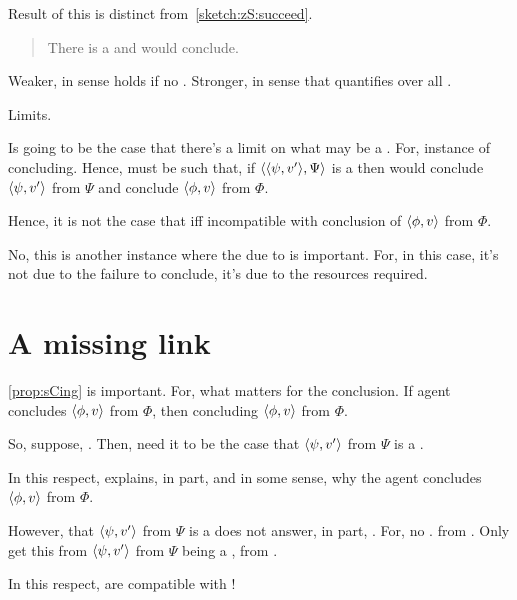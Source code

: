 \begin{note}
  Result of this is distinct from~\autoref{sketch:zS:succeed}.

  \begin{quote}
    There is a \curb{} and would conclude.
  \end{quote}

  Weaker, in sense holds if no \curb{}.
  Stronger, in sense that quantifies over all \curb{}.
\end{note}


\begin{note}
  Limits.

  Is going to be the case that there's a limit on what may be a \curb{}.
  For, instance of concluding.
  Hence, must be such that, if \(\langle \langle \psi, v' \rangle, \Psi \rangle\) is a \curb{} then would conclude \(\langle \psi, v' \rangle\) from \(\Psi\) and conclude \(\langle \phi, v \rangle\) from \(\Phi\).

  Hence, it is not the case that \curb{} iff incompatible with conclusion of \(\langle \phi, v \rangle\) from \(\Phi\).

  No, this is another instance where the due to is important.
  For, in this case, it's not due to the failure to conclude, it's due to the resources required.
\end{note}

\section{A missing link}
\label{cha:zS:sec:missing-link}

\begin{note}
  \autoref{prop:sCing} is important.
  For, what matters for the conclusion.
  If agent concludes \(\langle \phi, v \rangle\) from \(\Phi\), then concluding \(\langle \phi, v \rangle\) from \(\Phi\).

  So, suppose, \curb{}.
  Then, need it to be the case that \(\langle \psi, v' \rangle\) from \(\Psi\) is a \fc{}.

  In this respect, \fc{} explains, in part, and in some sense, why the agent concludes \(\langle \phi, v \rangle\) from \(\Phi\).

  However, that \(\langle \psi, v' \rangle\) from \(\Psi\) is a \fc{} does not answer, in part, \qWhyV{}.
  For, no \ros{}.
  \ros{} from \agpe{}.
  Only get this from \(\langle \psi, v' \rangle\) from \(\Psi\) being a \fc{}, from \agpe{}.

  In this respect,  are compatible with \issueConstraint{}!
\end{note}


